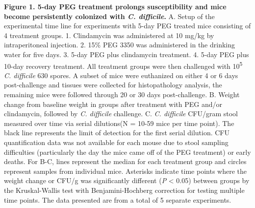 \documentclass[
  11pt,
]{article}
\begin{document}
\textbf{Figure 1. 5-day PEG treatment prolongs susceptibility and mice
become persistently colonized with \emph{C. difficile}.} A. Setup of the
experimental time line for experiments with 5-day PEG treated mice
consisting of 4 treatment groups. 1. Clindamycin was administered at 10
mg/kg by intraperitoneal injection. 2. 15\% PEG 3350 was administered in
the drinking water for five days. 3. 5-day PEG plus clindamycin
treatment. 4. 5-day PEG plus 10-day recovery treatment. All treatment
groups were then challenged with 10\textsuperscript{5} \emph{C.
difficile} 630 spores. A subset of mice were euthanized on either 4 or 6
days post-challenge and tissues were collected for histopathology
analysis, the remaining mice were followed through 20 or 30 days
post-challenge. B. Weight change from baseline weight in groups after
treatment with PEG and/or clindamycin, followed by \emph{C. difficile}
challenge. C. \emph{C. difficile} CFU/gram stool measured over time via
serial dilutions(N = 10-59 mice per time point). The black line
represents the limit of detection for the first serial dilution. CFU
quantification data was not available for each mouse due to stool
sampling difficulties (particularly the day the mice came off of the PEG
treatment) or early deaths. For B-C, lines represent the median for each
treatment group and circles represent samples from individual mice.
Asterisks indicate time points where the weight change or CFU/g was
significantly different (\emph{P} \textless{} 0.05) between groups by
the Kruskal-Wallis test with Benjamini-Hochberg correction for testing
multiple time points. The data presented are from a total of 5 separate
experiments. \newpage
\end{document}
